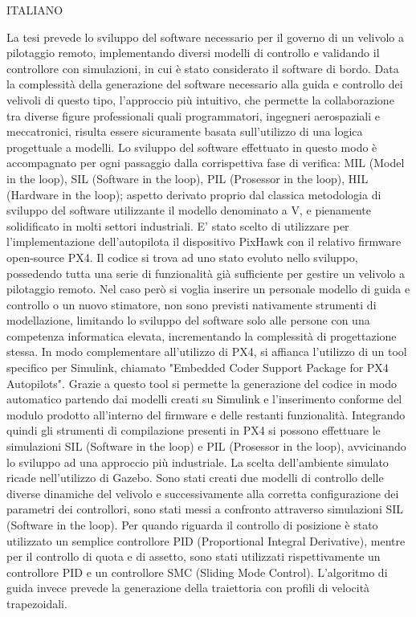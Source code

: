 \begin{commento}
ITALIANO


La tesi prevede lo sviluppo del software necessario per il governo di un velivolo a pilotaggio remoto, implementando diversi modelli di controllo e validando il controllore con simulazioni, in cui è stato considerato il software di bordo.
Data la complessità della generazione del software necessario alla guida e controllo dei velivoli di questo tipo, l'approccio più intuitivo, che permette la collaborazione tra diverse figure professionali quali programmatori, ingegneri aerospaziali e meccatronici, risulta essere sicuramente basata sull'utilizzo di una logica progettuale a modelli.
Lo sviluppo del software effettuato in questo modo è accompagnato per ogni passaggio dalla corrispettiva fase di verifica: MIL (Model in the loop), SIL (Software in the loop), PIL (Prosessor in the loop), HIL (Hardware in the loop); aspetto derivato proprio dal classica metodologia di sviluppo del software utilizzante il modello denominato a V, e pienamente solidificato in molti settori industriali.
E' stato scelto di utilizzare per l'implementazione dell'autopilota il dispositivo PixHawk con il relativo firmware open-source PX4. Il codice si trova ad uno stato evoluto nello sviluppo, possedendo tutta una serie di funzionalità già sufficiente per gestire un velivolo a pilotaggio remoto. Nel caso però si voglia inserire un personale modello di guida e controllo o un nuovo stimatore, non sono previsti nativamente strumenti di modellazione, limitando lo sviluppo del software solo alle persone con una competenza informatica elevata, incrementando la complessità di progettazione stessa.
In modo complementare all'utilizzo di PX4, si affianca l'utilizzo di un tool specifico per Simulink, chiamato "Embedded Coder Support Package
for PX4 Autopilots". Grazie a questo tool si permette la generazione del codice in modo automatico partendo dai modelli creati su Simulink e l'inserimento conforme del modulo prodotto all'interno del firmware e delle restanti funzionalità. Integrando quindi gli strumenti di compilazione presenti in PX4 si possono effettuare le simulazioni SIL (Software in the loop) e PIL (Prosessor in the loop), avvicinando lo sviluppo ad una approccio più industriale.
La scelta dell'ambiente simulato ricade nell'utilizzo di Gazebo.
Sono stati creati due modelli di controllo delle diverse dinamiche del velivolo e successivamente alla corretta configurazione dei parametri dei controllori, sono stati messi a confronto attraverso simulazioni SIL (Software in the loop). Per quando riguarda il controllo di posizione è stato utilizzato un semplice controllore PID (Proportional Integral Derivative), mentre per il controllo di quota e di assetto, sono stati utilizzati rispettivamente un controllore PID e un controllore SMC (Sliding Mode Control). L'algoritmo di guida invece prevede la generazione della traiettoria con profili di velocità trapezoidali.

\end{commento}
